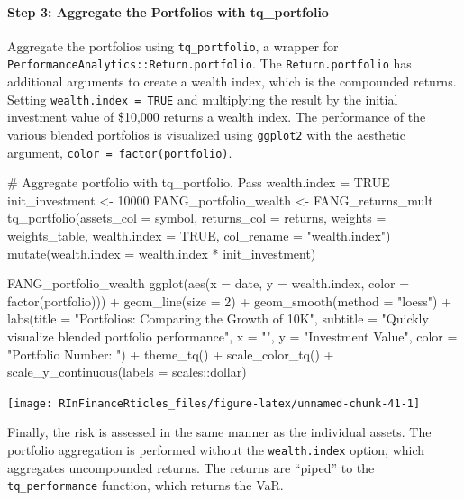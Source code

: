 \hspace{20 mm}

\paragraph{Step 3: Aggregate the Portfolios with
tq\_portfolio}\label{step-3-aggregate-the-portfolios-with-tq_portfolio}

Aggregate the portfolios using \texttt{tq\_portfolio}, a wrapper for
\texttt{PerformanceAnalytics::Return.portfolio}. The
\texttt{Return.portfolio} has additional arguments to create a wealth
index, which is the compounded returns. Setting
\texttt{wealth.index\ =\ TRUE} and multiplying the result by the initial
investment value of \$10,000 returns a wealth index. The performance of
the various blended portfolios is visualized using \texttt{ggplot2} with
the aesthetic argument, \texttt{color\ =\ factor(portfolio)}.

\begin{Schunk}
\begin{Sinput}
# Aggregate portfolio with tq_portfolio. Pass wealth.index = TRUE
init_investment <- 10000
FANG_portfolio_wealth <- FANG_returns_mult %
    tq_portfolio(assets_col = symbol, returns_col = returns,
                 weights = weights_table, wealth.index = TRUE,
                 col_rename = "wealth.index") %
    mutate(wealth.index = wealth.index * init_investment)

FANG_portfolio_wealth  %
    ggplot(aes(x = date, y = wealth.index, color = factor(portfolio))) +
    geom_line(size = 2) +
    geom_smooth(method = "loess") +
    labs(title = "Portfolios: Comparing the Growth of 10K",
         subtitle = "Quickly visualize blended portfolio performance",
         x = "", y = "Investment Value",
         color = "Portfolio Number: ") +
    theme_tq() +
    scale_color_tq() +
    scale_y_continuous(labels = scales::dollar)
\end{Sinput}


\begin{center}\texttt{[image: RInFinanceRticles\_files/figure-latex/unnamed-chunk-41-1]} \end{center}

\end{Schunk}

Finally, the risk is assessed in the same manner as the individual
assets. The portfolio aggregation is performed without the
\texttt{wealth.index} option, which aggregates uncompounded returns. The
returns are ``piped'' to the \texttt{tq\_performance} function, which
returns the VaR.

